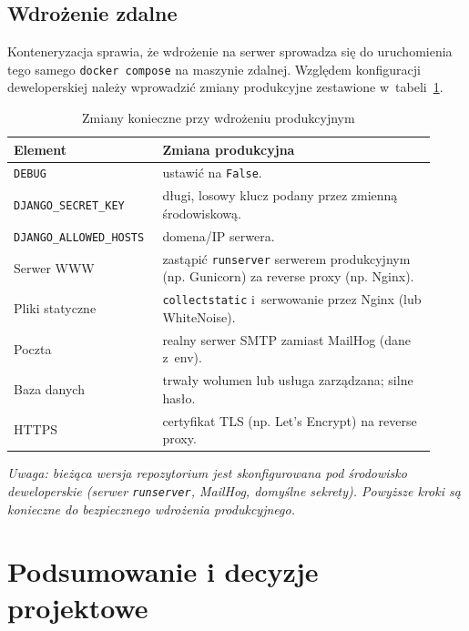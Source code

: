 \documentclass[12pt,a4paper]{article}
\begin{document}
\subsection{Wdrożenie zdalne}

Konteneryzacja sprawia, że wdrożenie na serwer sprowadza się do uruchomienia tego
samego \texttt{docker compose} na maszynie zdalnej. Względem konfiguracji
deweloperskiej należy wprowadzić zmiany produkcyjne zestawione w~tabeli~\ref{tab:prod}.

\begin{longtable}{p{0.30\linewidth}p{0.62\linewidth}}
\caption{Zmiany konieczne przy wdrożeniu produkcyjnym}\label{tab:prod}\\
\toprule
\textbf{Element} & \textbf{Zmiana produkcyjna} \\
\midrule
\endhead
\texttt{DEBUG} & ustawić na \texttt{False}. \\
\texttt{DJANGO\_SECRET\_KEY} & długi, losowy klucz podany przez zmienną środowiskową. \\
\texttt{DJANGO\_ALLOWED\_HOSTS} & domena/IP serwera. \\
Serwer WWW & zastąpić \texttt{runserver} serwerem produkcyjnym (np. Gunicorn) za reverse proxy (np. Nginx). \\
Pliki statyczne & \texttt{collectstatic} i~serwowanie przez Nginx (lub WhiteNoise). \\
Poczta & realny serwer SMTP zamiast MailHog (dane z~env). \\
Baza danych & trwały wolumen lub usługa zarządzana; silne hasło. \\
HTTPS & certyfikat TLS (np. Let's Encrypt) na reverse proxy. \\
\bottomrule
\end{longtable}

\noindent\textit{Uwaga: bieżąca wersja repozytorium jest skonfigurowana pod
środowisko deweloperskie (serwer \texttt{runserver}, MailHog, domyślne sekrety).
Powyższe kroki są konieczne do bezpiecznego wdrożenia produkcyjnego.}

\section{Podsumowanie i decyzje projektowe}
\label{sec:wnioski}
\end{document}
